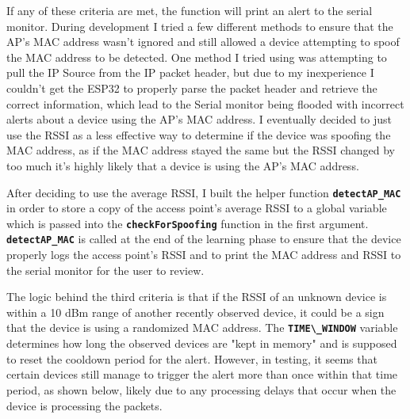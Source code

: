 \documentclass[letterpaper, 11pt]{article}
\begin{document}
\indent If any of these criteria are met, the function will print an alert to the serial monitor. During development I tried a few different methods to ensure that the AP's MAC address wasn't ignored and still
allowed a device attempting to spoof the MAC address to be detected. One method I tried using was attempting to pull the IP Source from the IP packet header, but due to my inexperience I couldn't get 
the ESP32 to properly parse the packet header and retrieve the correct information, which lead to the Serial monitor being flooded with incorrect alerts about a device using the AP's MAC address. 
I eventually decided to just use the RSSI as a less effective way to determine if the device was spoofing the MAC address, as if the MAC address stayed the same but the RSSI changed by too much it's 
highly likely that a device is using the AP's MAC address.

\indent After deciding to use the average RSSI, I built the helper function \textbf{\lstinline[]|detectAP_MAC|} in order to store a copy of the access point's average RSSI to a global variable
which is passed into the \textbf{\lstinline[]|checkForSpoofing|} function in the first argument. \textbf{\lstinline[]|detectAP_MAC|} is called at the end of the learning phase to ensure that the 
device properly logs the access point's RSSI and to print the MAC address and RSSI to the serial monitor for the user to review.

\indent The logic behind the third criteria is that if the RSSI of an unknown device is within a 10 dBm range
of another recently observed device, it could be a sign that the device is using a randomized MAC address. The \textbf{\lstinline[]|TIME\_WINDOW|} variable determines how long the observed devices are "kept in memory" 
and is supposed to reset the cooldown period for the alert. However, in testing, it seems that certain devices still manage to trigger the alert more than once within that time period, as shown below, 
likely due to any processing delays that occur when the device is processing the packets. 
\end{document}
